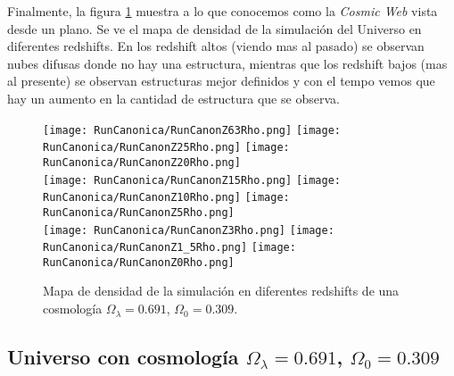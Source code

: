 Finalmente, la figura \ref{fig:CanonRunDensityMap} muestra a lo que conocemos como la \emph{Cosmic Web} vista desde un plano. Se ve el mapa de densidad de la simulación del Universo en diferentes redshifts. En los redshift altos (viendo mas al pasado) se observan nubes difusas donde no hay una estructura, mientras que los redshift bajos (mas al presente) se observan estructuras mejor definidos y con el tempo vemos que hay un aumento en la cantidad de estructura que se observa.


\begin{figure}[ht!]
    \centering

    \texttt{[image: RunCanonica/RunCanonZ63Rho.png]}   %
    \texttt{[image: RunCanonica/RunCanonZ25Rho.png]}   %
    \texttt{[image: RunCanonica/RunCanonZ20Rho.png]}   %
    \\
    \texttt{[image: RunCanonica/RunCanonZ15Rho.png]}   %
    \texttt{[image: RunCanonica/RunCanonZ10Rho.png]}   %
    \texttt{[image: RunCanonica/RunCanonZ5Rho.png]}    %
    \\
    \texttt{[image: RunCanonica/RunCanonZ3Rho.png]}    %
    \texttt{[image: RunCanonica/RunCanonZ1\_5Rho.png]}  %
    \texttt{[image: RunCanonica/RunCanonZ0Rho.png]}    %
    \caption[Mapa de densidad de un Universo $\Omega_\lambda = 0.691 $, $\Omega_0 = 0.309$ en en diferentes redshift]{ \footnotesize Mapa de densidad de la simulación en diferentes redshifts de una cosmología $\Omega_\lambda = 0.691 $, $\Omega_0 = 0.309$. }
    \label{fig:CanonRunDensityMap}
\end{figure}








\subsection{ Universo con cosmología  \texorpdfstring{$\Omega_\lambda = 0.691$, $\Omega_0 = 0.309$ }{Omega lambda = 0.691, Omega 0 = 0.309} }


